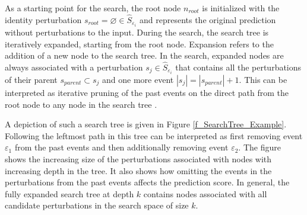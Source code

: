
As a starting point for the search, the root node $n_{root}$ is initialized with the identity perturbation $s_{root} = \varnothing \in \hat{S}_{\varepsilon_i}$ and represents the original prediction without perturbations to the input. During the search, the search tree is iteratively expanded, starting from the root node. Expansion refers to the addition of a new node to the search tree. In the search, expanded nodes are always associated with a perturbation $s_j \in \hat{S}_{\varepsilon_i}$ that contains all the perturbations of their parent $s_{parent} \subset s_j$ and one more event $|s_j| = |s_{parent}| + 1$. This can be interpreted as iterative pruning of the past events on the direct path from the root node to any node in the search tree \cite{yuan_explainability_2021}.

A depiction of such a search tree is given in Figure \ref{f_SearchTree_Example}. Following the leftmost path in this tree can be interpreted as first removing event $\varepsilon_1$ from the past events and then additionally removing event $\varepsilon_2$. The figure shows the increasing size of the perturbations associated with nodes with increasing depth in the tree. It also shows how omitting the events in the perturbations from the past events affects the prediction score. In general, the fully expanded search tree at depth $k$ contains nodes associated with all candidate perturbations in the search space of size $k$.


